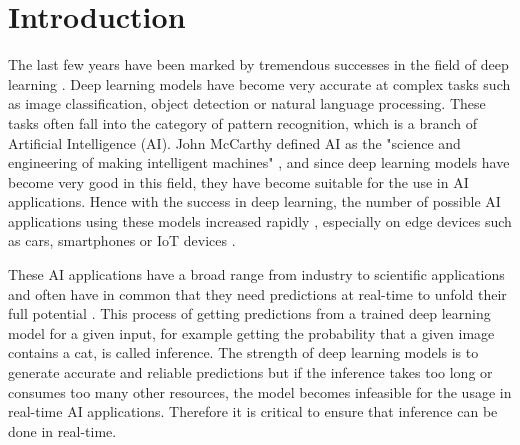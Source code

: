 \chapter{Introduction}

The last few years have been marked by tremendous successes in the field of deep learning \cite{DBLP:journals/corr/abs-1807-08169,DBLP:journals/corr/abs-1806-08894}.
Deep learning models have become very accurate at complex tasks such as image classification, object detection or natural language processing. 
These tasks often fall into the category of pattern recognition, which is a branch of Artificial Intelligence (AI).
John McCarthy defined AI as the "science and engineering of making intelligent machines" \cite{AI}, and since deep learning models have become very good in this field, they have become suitable for the use in AI applications.
Hence with the success in deep learning, the number of possible AI applications using these models increased rapidly \cite{inproceedings, breadth}, especially on edge devices such as cars, smartphones or IoT devices \cite{futureMLtiny, MovingToEdge}.

These AI applications have a broad range from industry to scientific applications and often have in common that they need predictions at real-time to unfold their full potential \cite{DBLP:journals/corr/NishiharaMWTPSL17, DBLP:journals/corr/CrankshawBGLZFGJ14}.
This process of getting predictions from a trained deep learning model for a given input, for example getting the probability that a given image contains a cat, is called inference.
The strength of deep learning models is to generate accurate and reliable predictions but if the inference takes too long or consumes too many other resources, the model becomes infeasible for the usage in real-time AI applications.
Therefore it is critical to ensure that inference can be done in real-time.

